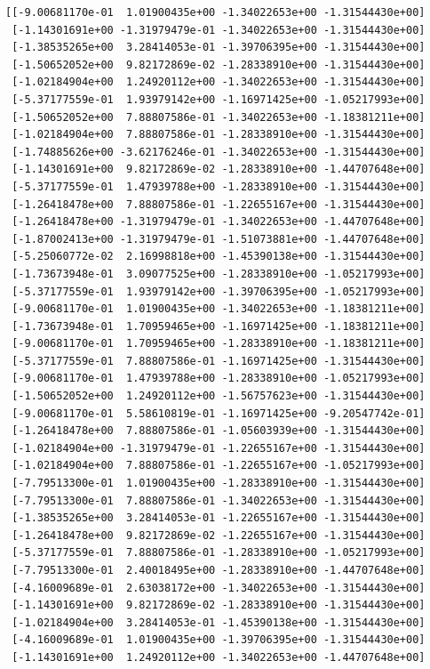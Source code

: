 \documentclass[
]{article}
\begin{document}
\begin{lstlisting}
[[-9.00681170e-01  1.01900435e+00 -1.34022653e+00 -1.31544430e+00]
 [-1.14301691e+00 -1.31979479e-01 -1.34022653e+00 -1.31544430e+00]
 [-1.38535265e+00  3.28414053e-01 -1.39706395e+00 -1.31544430e+00]
 [-1.50652052e+00  9.82172869e-02 -1.28338910e+00 -1.31544430e+00]
 [-1.02184904e+00  1.24920112e+00 -1.34022653e+00 -1.31544430e+00]
 [-5.37177559e-01  1.93979142e+00 -1.16971425e+00 -1.05217993e+00]
 [-1.50652052e+00  7.88807586e-01 -1.34022653e+00 -1.18381211e+00]
 [-1.02184904e+00  7.88807586e-01 -1.28338910e+00 -1.31544430e+00]
 [-1.74885626e+00 -3.62176246e-01 -1.34022653e+00 -1.31544430e+00]
 [-1.14301691e+00  9.82172869e-02 -1.28338910e+00 -1.44707648e+00]
 [-5.37177559e-01  1.47939788e+00 -1.28338910e+00 -1.31544430e+00]
 [-1.26418478e+00  7.88807586e-01 -1.22655167e+00 -1.31544430e+00]
 [-1.26418478e+00 -1.31979479e-01 -1.34022653e+00 -1.44707648e+00]
 [-1.87002413e+00 -1.31979479e-01 -1.51073881e+00 -1.44707648e+00]
 [-5.25060772e-02  2.16998818e+00 -1.45390138e+00 -1.31544430e+00]
 [-1.73673948e-01  3.09077525e+00 -1.28338910e+00 -1.05217993e+00]
 [-5.37177559e-01  1.93979142e+00 -1.39706395e+00 -1.05217993e+00]
 [-9.00681170e-01  1.01900435e+00 -1.34022653e+00 -1.18381211e+00]
 [-1.73673948e-01  1.70959465e+00 -1.16971425e+00 -1.18381211e+00]
 [-9.00681170e-01  1.70959465e+00 -1.28338910e+00 -1.18381211e+00]
 [-5.37177559e-01  7.88807586e-01 -1.16971425e+00 -1.31544430e+00]
 [-9.00681170e-01  1.47939788e+00 -1.28338910e+00 -1.05217993e+00]
 [-1.50652052e+00  1.24920112e+00 -1.56757623e+00 -1.31544430e+00]
 [-9.00681170e-01  5.58610819e-01 -1.16971425e+00 -9.20547742e-01]
 [-1.26418478e+00  7.88807586e-01 -1.05603939e+00 -1.31544430e+00]
 [-1.02184904e+00 -1.31979479e-01 -1.22655167e+00 -1.31544430e+00]
 [-1.02184904e+00  7.88807586e-01 -1.22655167e+00 -1.05217993e+00]
 [-7.79513300e-01  1.01900435e+00 -1.28338910e+00 -1.31544430e+00]
 [-7.79513300e-01  7.88807586e-01 -1.34022653e+00 -1.31544430e+00]
 [-1.38535265e+00  3.28414053e-01 -1.22655167e+00 -1.31544430e+00]
 [-1.26418478e+00  9.82172869e-02 -1.22655167e+00 -1.31544430e+00]
 [-5.37177559e-01  7.88807586e-01 -1.28338910e+00 -1.05217993e+00]
 [-7.79513300e-01  2.40018495e+00 -1.28338910e+00 -1.44707648e+00]
 [-4.16009689e-01  2.63038172e+00 -1.34022653e+00 -1.31544430e+00]
 [-1.14301691e+00  9.82172869e-02 -1.28338910e+00 -1.31544430e+00]
 [-1.02184904e+00  3.28414053e-01 -1.45390138e+00 -1.31544430e+00]
 [-4.16009689e-01  1.01900435e+00 -1.39706395e+00 -1.31544430e+00]
 [-1.14301691e+00  1.24920112e+00 -1.34022653e+00 -1.44707648e+00]

\end{lstlisting}
\end{document}
